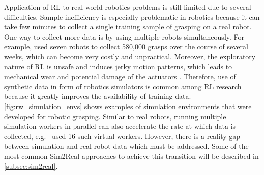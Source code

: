Application of RL to real world robotics problems is still limited due to several difficulties. Sample inefficiency is especially problematic in robotics because it can take few minutes to collect a single training sample of grasping on a real robot. One way to collect more data is by using multiple robots simultaneously. For example, \citet{kalashnikov_qt-opt_2018} used seven robots to collect 580,000 grasps over the course of several weeks, which can become very costly and unpractical. Moreover, the exploratory nature of RL is unsafe and induces jerky motion patterns, which leads to mechanical wear and potential damage of the actuators \cite{kroemer_review_2021}. Therefore, use of synthetic data in form of robotics simulators is common among RL research because it greatly improves the availability of training data. \autoref{fig:rw_simulation_envs} shows examples of simulation environments that were developed for robotic grasping. Similar to real robots, running multiple simulation workers in parallel can also accelerate the rate at which data is collected, e.g.~\citet{popov_data-efficient_2017} used 16 such virtual workers. However, there is a reality gap between simulation and real robot data which must be addressed. Some of the most common Sim2Real approaches to achieve this transition will be described in \autoref{subsec:sim2real}.


